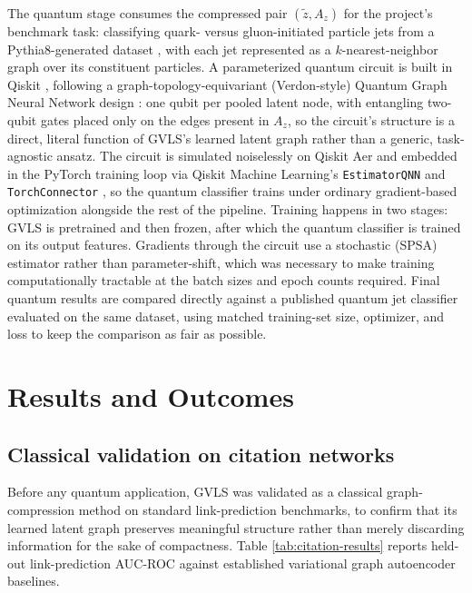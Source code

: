 \documentclass[11pt]{article}
\begin{document}
The quantum stage consumes the compressed pair $(\tilde z, A_z)$ for the
project's benchmark task: classifying quark- versus gluon-initiated particle
jets from a Pythia8-generated dataset \cite{sjostrand2008pythia,
komiske2019energyflow}, with each jet represented as a $k$-nearest-neighbor
graph over its constituent particles. A parameterized quantum circuit is
built in Qiskit \cite{qiskit2024}, following a graph-topology-equivariant
(Verdon-style) Quantum Graph Neural Network design \cite{verdon2019quantum}:
one qubit per pooled latent node, with entangling two-qubit gates placed
only on the edges present in $A_z$, so the circuit's structure is a direct,
literal function of GVLS's learned latent graph rather than a generic,
task-agnostic ansatz. The circuit is simulated noiselessly on Qiskit Aer and
embedded in the PyTorch training loop via Qiskit Machine Learning's
\texttt{EstimatorQNN} and \texttt{TorchConnector} \cite{qiskit2024}, so the
quantum classifier trains under ordinary gradient-based optimization
alongside the rest of the pipeline. Training happens in two stages: GVLS is
pretrained and then frozen, after which the quantum classifier is trained on
its output features. Gradients through the circuit use a stochastic (SPSA)
estimator \cite{spall1992spsa} rather than parameter-shift, which was
necessary to make training computationally tractable at the batch sizes and
epoch counts required. Final quantum results are compared directly against a
published quantum jet classifier \cite{lorentzeqgnn2024} evaluated on the
same dataset, using matched training-set size, optimizer, and loss to keep
the comparison as fair as possible.

\section*{Results and Outcomes}

\subsection*{Classical validation on citation networks}

Before any quantum application, GVLS was validated as a classical
graph-compression method on standard link-prediction benchmarks, to confirm
that its learned latent graph preserves meaningful structure rather than
merely discarding information for the sake of compactness. Table
\ref{tab:citation-results} reports held-out link-prediction AUC-ROC against
established variational graph autoencoder baselines.
\end{document}

